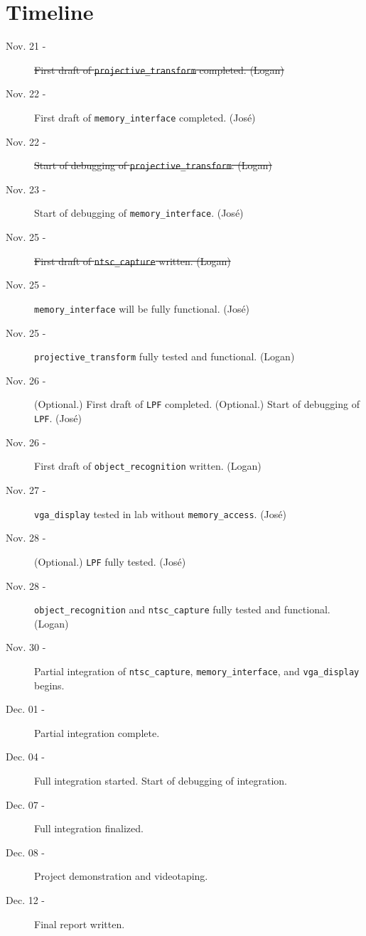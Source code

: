 \documentclass{article}
\begin{document}
\section{Timeline}
\begin{description}
\item[Nov. 21 -] \sout{First draft of {\tt projective\_transform} completed. (Logan)}
\item[Nov. 22 -] First draft of {\tt memory\_interface} completed. (Jos\'{e})
\item[Nov. 22 -] \sout{Start of debugging of {\tt projective\_transform}. (Logan)}
\item[Nov. 23 -] Start of debugging of {\tt memory\_interface}. (Jos\'{e})
\item[Nov. 25 -] \sout{First draft of {\tt ntsc\_capture} written. (Logan)}
\item[Nov. 25 -] {\tt memory\_interface} will be fully functional. (Jos\'{e})
\item[Nov. 25 -] {\tt projective\_transform} fully tested and functional. (Logan)
\item[Nov. 26 -] (Optional.) First draft of {\tt LPF} completed. (Optional.) Start of debugging of {\tt LPF}. (Jos\'{e})
\item[Nov. 26 -] First draft of {\tt object\_recognition} written. (Logan)
\item[Nov. 27 -] {\tt vga\_display} tested in lab without {\tt memory\_access}. (Jos\'{e})
\item[Nov. 28 -] (Optional.) {\tt LPF} fully tested. (Jos\'{e})
\item[Nov. 28 -] {\tt object\_recognition} and {\tt ntsc\_capture} fully tested and functional. (Logan)
\item[Nov. 30 -] Partial integration of {\tt ntsc\_capture}, {\tt memory\_interface}, and {\tt vga\_display} begins.
\item[Dec. 01 -] Partial integration complete.
\item[Dec. 04 -] Full integration started. Start of debugging of integration.
\item[Dec. 07 -] Full integration finalized.
\item[Dec. 08 -] Project demonstration and videotaping.
\item[Dec. 12 -] Final report written.
\end{description}
\end{document}
